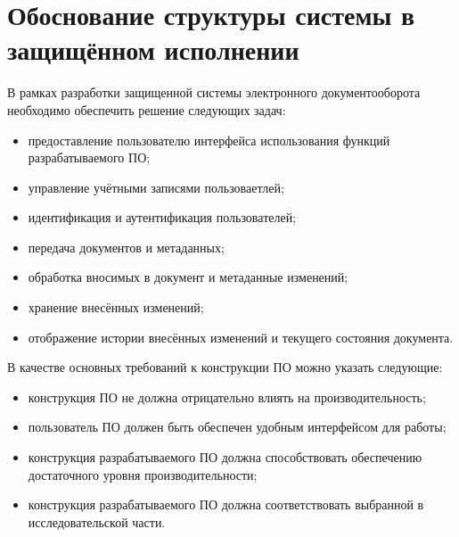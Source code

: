 \section{Обоснование структуры системы в защищённом исполнении} \label{model}

В рамках разработки защищенной системы электронного документооборота необходимо обеспечить решение следующих задач:
\begin{itemize}
	\item предоставление пользователю интерфейса использования функций разрабатываемого ПО;
	\item управление учётными записями пользоваетлей;
	\item идентификация и аутентификация пользователей;
	\item передача документов и метаданных;
	\item обработка вносимых в документ и метаданные изменений;
	\item хранение внесённых изменений;
	\item отображение истории внесённых изменений и текущего состояния документа.
\end{itemize}

\vspace{\baselineskip}
В качестве основных требований к конструкции ПО можно указать следующие:
\begin{itemize}
	\item конструкция ПО не должна отрицательно влиять на производительность;
	\item пользователь ПО должен быть обеспечен удобным интерфейсом для работы;
	\item конструкция разрабатываемого ПО должна способствовать обеспечению достаточного уровня производительности;
	\item конструкция разрабатываемого ПО должна соответствовать выбранной в исследовательской части.
\end{itemize}